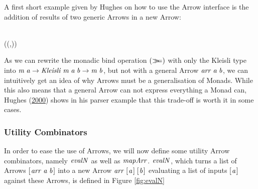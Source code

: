 \documentclass[paper=A4,twoside=true,openright,parskip=full,chapterprefix=true,headings=normal,bibliography=totoc,listof=totoc,titlepage=on,captions=tableabove,draft=false,british]{scrreprt}%
\begin{document}
A first short example given by Hughes on how to use the Arrow interface
is the addition of results of two generic Arrows in a new Arrow:


\begin{hscode}\SaveRestoreHook
{}%
%
\>[B]{}\mathbin{::}\;\Rightarrow {}\;\;\to {}\;\;\to {}\;\;\<[E]%
\\
\>[B]{}\;\;\mathrel{=}\mathbin{\&\!\&\!\&}\mathbin{>\!\!>\!\!>}\;(\lambda (,)\to {}\mathbin{+}){}\<[E]%
\ColumnHook
\end{hscode}\resethooks
\vspace{-2\baselineskip}

As we can rewrite the monadic bind operation \ensuremath{(\bind )} with only the
Kleisli type into \ensuremath{\Varid{m}\;\Varid{a}\to \Conid{Kleisli}\;\Varid{m}\;\Varid{a}\;\Varid{b}\to \Varid{m}\;\Varid{b}}, but not with a general
Arrow \ensuremath{\Varid{arr}\;\Varid{a}\;\Varid{b}}, we can intuitively get an idea of why Arrows must be a
generalisation of Monads. While this also means that a general Arrow can
not express everything a Monad can, Hughes
(\protect\hyperlink{ref-HughesArrows}{2000}) shows in his parser example
that this trade-off is worth it in some cases.

\hypertarget{utility-combinators}{%
\subsubsection{Utility Combinators}\label{utility-combinators}}

\label{utilfns}

In order to ease the use of Arrows, we will now define some utility
Arrow combinators, namely \ensuremath{\Varid{evalN}} as well as \ensuremath{\Varid{mapArr}}. \ensuremath{\Varid{evalN}}, which
turns a list of Arrows \ensuremath{[\mskip1.5mu \Varid{arr}\;\Varid{a}\;\Varid{b}\mskip1.5mu]} into a new Arrow \ensuremath{\Varid{arr}\;[\mskip1.5mu \Varid{a}\mskip1.5mu]\;[\mskip1.5mu \Varid{b}\mskip1.5mu]}
evaluating a list of inputs \ensuremath{[\mskip1.5mu \Varid{a}\mskip1.5mu]} against these Arrows, is defined in
Figure \ref{fig:evalN}
\end{document}
